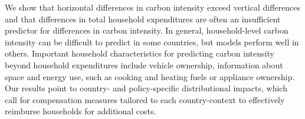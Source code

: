 \documentclass[12pt, a4paper]{article}
\begin{document}

We show that horizontal differences in carbon intensity exceed vertical differences and that differences in total household expenditures are often an insufficient predictor for differences in carbon intensity. In general, household-level carbon intensity can be difficult to predict in some countries, but models perform well in others. Important household characteristics for predicting carbon intensity beyond household expenditures include vehicle ownership, information about space and energy use, such as cooking and heating fuels or appliance ownership. Our results point to country- and policy-specific distributional impacts, which call for compensation measures tailored to each country-context to effectively reimburse households for additional costs. 
\end{document}
